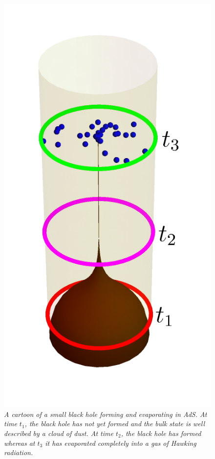 \documentclass[12pt]{article}
\begin{document}
\begin{figure}[!ht]
\begin{center}
\includegraphics[height=0.5\textheight]{hardnessprogress.pdf}
\caption{\em A cartoon of a small black hole forming and evaporating in AdS. At time $t_1$, the black hole has not yet formed and the bulk state is well described by a cloud of dust. At time $t_2$, the black hole has formed whereas at $t_3$ it has evaporated completely into a gas of Hawking radiation. \label{figadsbh}}
\end{center}
\end{figure}
\end{document}

